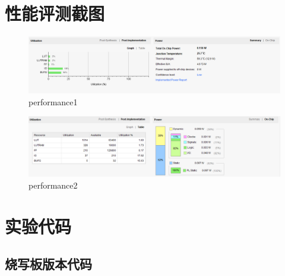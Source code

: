 \documentclass[12pt, a4paper]{article}
\begin{document}
\section{性能评测截图}
\begin{figure}[H]
	\centering
	\includegraphics[width=1\linewidth]{pics/per1}
	\caption{performance1}
	\label{fig:per1}
\end{figure}
\begin{figure}[H]
	\centering
	\includegraphics[width=1\linewidth]{pics/per2}
	\caption{performance2}
	\label{fig:per2}
\end{figure}



\section{实验代码}
\subsection {烧写板版本代码}









\end{document}
